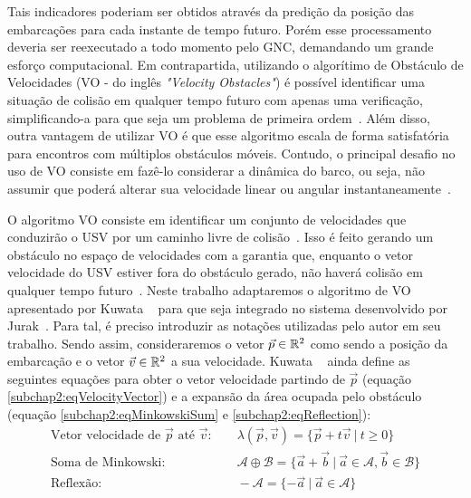         Tais indicadores poderiam ser obtidos através da predição da posição das embarcações para cada instante de tempo futuro. Porém esse processamento deveria ser reexecutado a todo momento pelo GNC, demandando um grande esforço computacional. Em contrapartida, utilizando o algorítimo de Obstáculo de Velocidades (VO - do inglês \textit{"Velocity Obstacles"}) é possível identificar uma situação de colisão em qualquer tempo futuro com apenas uma verificação, simplificando-a para que seja um problema de primeira ordem~\cite{KUWATA2014110}. Além disso, outra vantagem de utilizar VO é que esse algoritmo escala de forma satisfatória para encontros com múltiplos obstáculos móveis. Contudo, o principal desafio no uso de VO consiste em fazê-lo considerar a dinâmica do barco, ou seja, não assumir que poderá alterar sua velocidade linear ou angular instantaneamente~\cite{HUANG2019142}.
        
        O algoritmo VO consiste em identificar um conjunto de velocidades que conduzirão o USV por um caminho livre de colisão~\cite{HUANG2019142}. Isso é feito gerando um obstáculo no espaço de velocidades com a garantia que, enquanto o vetor velocidade do USV estiver fora do obstáculo gerado, não haverá colisão em qualquer tempo futuro~\cite{KUWATA2014110}. Neste trabalho adaptaremos o algoritmo de VO apresentado por Kuwata \etal ~\cite{KUWATA2014110} para que seja integrado no sistema desenvolvido por Jurak~\cite{JURAK2020}. Para tal, é preciso introduzir as notações utilizadas pelo autor em seu trabalho. Sendo assim, consideraremos o vetor $\vec{p} \in \mathbb{R}^2$ como sendo a posição da embarcação e o vetor $\vec{v} \in \mathbb{R}^2$ a sua velocidade. Kuwata \etal ~\cite{KUWATA2014110} ainda define as seguintes equações para obter o vetor velocidade partindo de $\vec{p}$ (equação \eqref{subchap2:eqVelocityVector}) e a expansão da área ocupada pelo obstáculo (equação \eqref{subchap2:eqMinkowskiSum} e \eqref{subchap2:eqReflection}):
        \begin{align}
            \text{Vetor velocidade de $\vec{p}$ até $\vec{v}$:}\quad&~\lambda(\vec{p}, \vec{v}) = \{\vec{p} + t\vec{v}~|~t \geq 0\}\label{subchap2:eqVelocityVector}\\
            \text{Soma de Minkowski:}\quad&~\mathcal{A} \oplus \mathcal{B}= \{\vec{a} + \vec{b}~|~\vec{a} \in \mathcal{A}, \vec{b} \in \mathcal{B}\}\label{subchap2:eqMinkowskiSum}\\
            \text{Reflexão:}\quad&~- \mathcal{A}= \{- \vec{a}~|~\vec{a} \in \mathcal{A}\}\label{subchap2:eqReflection}
        \end{align}
        
